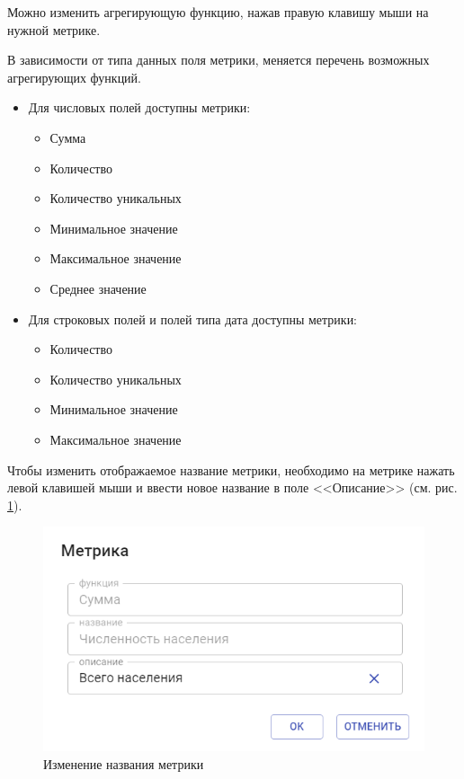 \documentclass[../user-manual.tex]{subfiles}
\begin{document}
	Можно изменить агрегирующую функцию, нажав правую клавишу мыши на нужной метрике.
	
	В зависимости от типа данных поля метрики, меняется перечень возможных агрегирующих функций.
	
	\begin{itemize}
		
		\item Для числовых полей доступны метрики:
			\begin{itemize}
				
				\item Сумма
				
				\item Количество
				
				\item Количество уникальных
				
				\item Минимальное значение
				
				\item Максимальное значение
				
				\item Среднее значение
			\end{itemize}
	
		\item Для строковых полей и полей типа дата доступны метрики:
			\begin{itemize}
			
				\item Количество
				
				\item Количество уникальных
			
				\item Минимальное значение
			
				\item Максимальное значение
			\end{itemize}
	
	\end{itemize}

	Чтобы изменить отображаемое название метрики, необходимо на метрике нажать левой клавишей мыши и ввести новое название в поле <<Описание>> (см. рис. \ref{fig:change-name}).
	
	\begin{figure}[h]
		\centering
		\includegraphics[width=\graphicswidth]{img/7-change-metrics-name.png}
		\caption{Изменение названия метрики}
		\label{fig:change-name}
	\end{figure}
	
\end{document}
